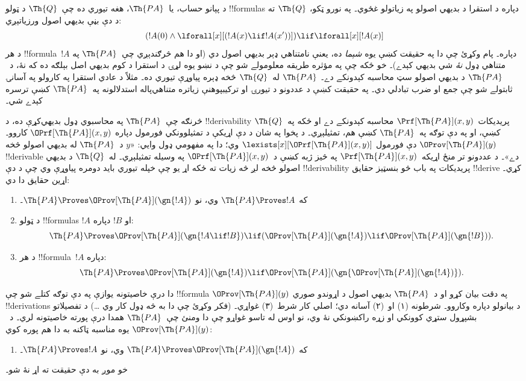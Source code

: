 \documentclass[../../../include/open-logic-section]{subfiles}
\begin{document}


د پېانو حساب، يا~$\Th{PA}$، هغه تيوري ده چې~$\Th{Q}$ د ټولو
!!{formula}s دپاره د استقرا د بديهي اصولو په زياتولو غځوي۔ په نورو
ټکو، $\Th{Q}$ ته د دې بڼې بديهي اصول ورزياتېږي:
\[
(!A(0) \land \lforall[x][(!A(x) \lif !A(x'))]) \lif \lforall[x][!A(x)]
\]
د هر !!{formula}~$!A$ دپاره۔ پام وکړئ چې دا په حقيقت کښې يوه
\emph{شېما} ده، يعنې نامتناهي ډېر بديهي اصول دي (او دا هم څرګندېږي
چې~$\Th{PA}$ په متناهي ډول {\em نۀ} شي بديهي کېدے)۔ خو ځکه چې
په مؤثره طريقه معلومولے شو چې د نښو يوه لړۍ د استقرا د کوم بديهي
اصل بېلګه ده که نۀ، د~$\Th{PA}$ د بديهي اصولو سټ محاسبه کېدونکے
دے۔ $\Th{PA}$ له~$\Th{Q}$ څخه ډېره پياوړې تيوري ده۔ مثلاً د
عادي استقرا په کارولو په آسانۍ ثابتولے شو چې جمع او ضرب تبادلي
دي۔ په حقيقت کښې د عددونو د تيورۍ او ترکيبپوهنې زياتره
متناهي‌پاله استدلالونه په~$\Th{PA}$ کښې ترسره کېدے شي۔

څرنګه چې~$\Th{PA}$ په محاسبوي ډول بديهي‌کړې ده، د
!!{derivability} پريديکات~$\Prf[\Th{PA}](x,y)$ محاسبه کېدونکے
دے او ځکه په~$\Th{Q}$ کښې، او په دې توګه په~$\Th{PA}$ کښې هم،
تمثيلېږي۔ د پخوا په شان د دې اړيکې د تمثيلوونکي فورمول دپاره
$\OPrf[\Th{PA}](x,y)$ کاروو۔ $\OProv[\Th{PA}](y)$ دې فورمول
$\lexists[x][\OPrf[\Th{PA}](x,y)]$ وي؛ دا په مفهومي ډول وايي:
«$y$ د~$\Th{PA}$ له بديهي اصولو څخه !!{derivable} دے»۔
د عددونو تر منځ اړيکه~$\Prf[\Th{PA}](x,y)$ په څيز ژبه کښې د~$\OPrf[\Th{PA}](x,y)$ په وسيله تمثيلېږي۔ له~$\Th{Q}$ د بديهي اصولو څخه لږ څه زيات ته ځکه اړ يو
چې خپله تيوري بايد دومره پياوړې وي چې د دې !!{derivability}
پريديکات په باب څو بنسټيز حقايق !!{derive} کړي۔ اړين حقايق دا دي:
\begin{enumerate}
\item[P1.] که $\Th{PA} \Proves !A$ وي، نو $\Th{PA} \Proves
  \OProv[\Th{PA}](\gn{!A})$۔
\item[P2.] د ټولو !!{formula}s $!A$ او $!B$ دپاره:
  \[
  \Th{PA} \Proves \OProv[\Th{PA}](\gn{!A \lif !B}) \lif
  (\OProv[\Th{PA}](\gn{!A}) \lif \OProv[\Th{PA}](\gn{!B})).
  \]
\item[P3.] د هر !!{formula}~$!A$ دپاره:
  \[
  \Th{PA} \Proves \OProv[\Th{PA}](\gn{!A})
  \lif \OProv[\Th{PA}](\gn{\OProv[\Th{PA}](\gn{!A})}).
  \]
\end{enumerate}
دا درې خاصيتونه يوازې په دې توګه کتلے شو چې !!{formula}
$\OProv[\Th{PA}](y)$ په دقت بيان کړو او د~$\Th{PA}$ بديهي اصول
د اړوندو صوري !!{derivation}s د بيانولو دپاره وکاروو۔ شرطونه (۱)
او~(۲) آسانه دي؛ اصلي کار شرط~(۳) غواړي۔ (فکر وکړئ چې دا به
څه ډول کار وي \dots) د تفصيلاتو بشپړول ستړي کوونکي او زړه راکښونکي
نۀ وي، نو اوس له تاسو غواړو چې دا ومنئ چې~$\Th{PA}$ همدا
درې پورته خاصيتونه لري۔ د~$\OProv[\Th{PA}](y)$ يوه مناسبه ټاکنه
به دا هم پوره کوي:
\begin{enumerate}
\item[P4.] که $\Th{PA} \Proves \OProv[\Th{PA}](\gn{!A})$ وي، نو
  $\Th{PA} \Proves !A$۔
\end{enumerate}
خو موږ به دې حقيقت ته اړ نۀ شو۔
\end{document}
